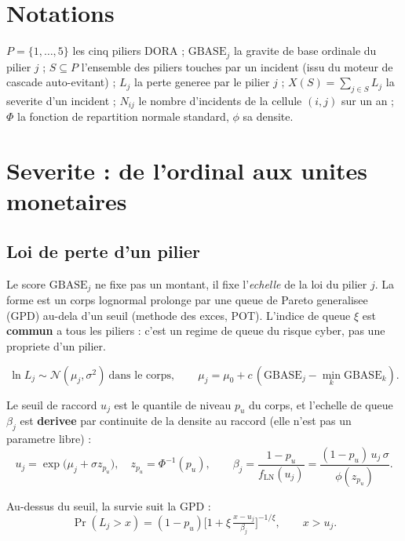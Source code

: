 \documentclass[11pt,a4paper]{article}
\begin{document}
\section{Notations}

$P=\{1,\dots,5\}$ les cinq piliers DORA ; $\mathrm{GBASE}_j$ la gravite de base
ordinale du pilier $j$ ; $S\subseteq P$ l'ensemble des piliers touches par un
incident (issu du moteur de cascade auto-evitant) ; $L_j$ la perte generee par le
pilier $j$ ; $X(S)=\sum_{j\in S} L_j$ la severite d'un incident ; $N_{ij}$ le nombre
d'incidents de la cellule $(i,j)$ sur un an ; $\Phi$ la fonction de repartition
normale standard, $\phi$ sa densite.

\section{Severite : de l'ordinal aux unites monetaires}

\subsection{Loi de perte d'un pilier}

Le score $\mathrm{GBASE}_j$ ne fixe pas un montant, il fixe l'\emph{echelle} de la
loi du pilier $j$. La forme est un corps lognormal prolonge par une queue de Pareto
generalisee (GPD) au-dela d'un seuil (methode des exces, POT). L'indice de queue
$\xi$ est \textbf{commun} a tous les piliers : c'est un regime de queue du risque
cyber, pas une propriete d'un pilier.

\begin{equation}
\ln L_j \sim \mathcal N(\mu_j,\sigma^2)\ \text{dans le corps},\qquad
\mu_j=\mu_0+c\,(\mathrm{GBASE}_j-\min_k \mathrm{GBASE}_k).
\end{equation}

Le seuil de raccord $u_j$ est le quantile de niveau $p_u$ du corps, et l'echelle de
queue $\beta_j$ est \textbf{derivee} par continuite de la densite au raccord (elle
n'est pas un parametre libre) :
\begin{equation}
u_j=\exp\!\big(\mu_j+\sigma z_{p_u}\big),\quad z_{p_u}=\Phi^{-1}(p_u),\qquad
\beta_j=\frac{1-p_u}{f_{\mathrm{LN}}(u_j)}=\frac{(1-p_u)\,u_j\,\sigma}{\phi(z_{p_u})}.
\end{equation}

Au-dessus du seuil, la survie suit la GPD :
\begin{equation}
\Pr(L_j>x)=(1-p_u)\Big[1+\xi\,\tfrac{x-u_j}{\beta_j}\Big]^{-1/\xi},\qquad x>u_j .
\end{equation}
\end{document}

